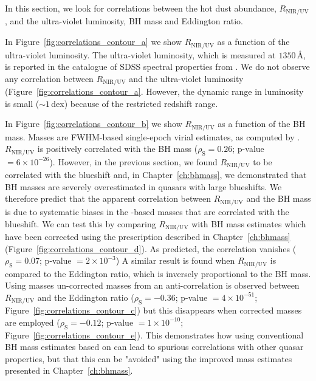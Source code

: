 In this section, we look for correlations between the hot dust abundance, $R_{\text{NIR/UV}}$, and the ultra-violet luminosity, BH mass and Eddington ratio. 

In Figure~\ref{fig:correlations_contour_a} we show $R_{\text{NIR/UV}}$ as a function of the ultra-violet luminosity. 
The ultra-violet luminosity, which is measured at $1350$\,\AA, is reported in the catalogue of SDSS spectral properties from \citet{shen11}. 
We do not observe any correlation between $R_{\text{NIR/UV}}$ and the ultra-violet luminosity (Figure~\ref{fig:correlations_contour_a}. 
However, the dynamic range in luminosity is small ($\sim1$\,dex) because of the restricted redshift range. 

In Figure~\ref{fig:correlations_contour_b} we show $R_{\text{NIR/UV}}$ as a function of the BH mass. 
Masses are  FWHM-based single-epoch virial estimates, as computed by \citet{shen11}. 
$R_{\text{NIR/UV}}$ is positively correlated with the BH mass ($\rho_{\text{S}} = 0.26$; p-value $=6\times10^{-26
}$). 
However, in the previous section, we found $R_{\text{NIR/UV}}$ to be correlated with the  blueshift and, in Chapter~\ref{ch:bhmass}, we demonstrated that BH masses are severely overestimated in quasars with large  blueshifts.
We therefore predict that the apparent correlation between $R_{\text{NIR/UV}}$ and the BH mass is due to systematic biases in the -based masses that are correlated with the  blueshift. 
We can test this by comparing $R_{\text{NIR/UV}}$ with BH mass estimates which have been corrected using the prescription described in Chapter~\ref{ch:bhmass} (Figure~\ref{fig:correlations_contour_d}). 
As predicted, the correlation vanishes ($\rho_{\text{S}}=0.07$; p-value $=2\times10^{-3}$)
A similar result is found when $R_{\text{NIR/UV}}$ is compared to the Eddington ratio, which is inversely proportional to the BH mass.  
Using masses un-corrected masses from \citet{shen11} an anti-correlation is observed between $R_{\text{NIR/UV}}$ and the Eddington ratio ($\rho_{\text{S}}=-0.36$; p-value $=4\times10^{-51}$; Figure~\ref{fig:correlations_contour_c}) but this disappears when corrected masses are employed ($\rho_{\text{S}}=-0.12$; p-value $=1\times10^{-10}$; Figure~\ref{fig:correlations_contour_e}). 
This demonstrates how using conventional BH mass estimates based on  can lead to spurious correlations with other quasar properties, but that this can be "avoided" using the improved mass estimates presented in Chapter~\ref{ch:bhmass}. 

